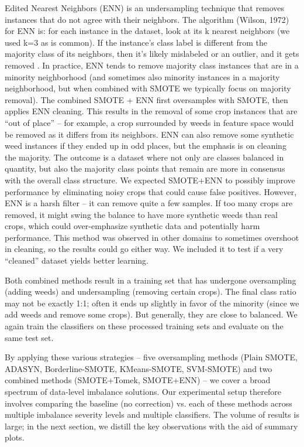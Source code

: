 \documentclass[agriengineering,article,submit,pdftex,moreauthors]{Definitions/mdpi}
\begin{document}
Edited Nearest Neighbors (ENN) is an undersampling technique that removes instances that do not agree with their neighbors. The algorithm (Wilson, 1972) for ENN is: for each instance in the dataset, look at its k nearest neighbors (we used k=3 as is common). If the instance’s class label is different from the majority class of its neighbors, then it’s likely mislabeled or an outlier, and it gets removed \cite{Wilson1972-dg}. In practice, ENN tends to remove majority class instances that are in a minority neighborhood (and sometimes also minority instances in a majority neighborhood, but when combined with SMOTE we typically focus on majority removal). The combined SMOTE + ENN first oversamples with SMOTE, then applies ENN cleaning. This results in the removal of some crop instances that are “out of place” – for example, a crop surrounded by weeds in feature space would be removed as it differs from its neighbors. ENN can also remove some synthetic weed instances if they ended up in odd places, but the emphasis is on cleaning the majority. The outcome is a dataset where not only are classes balanced in quantity, but also the majority class points that remain are more in consensus with the overall class structure. We expected SMOTE+ENN to possibly improve performance by eliminating noisy crops that could cause false positives. However, ENN is a harsh filter – it can remove quite a few samples. If too many crops are removed, it might swing the balance to have more synthetic weeds than real crops, which could over-emphasize synthetic data and potentially harm performance. This method was observed in other domains to sometimes overshoot in cleaning, so the results could go either way. We included it to test if a very “cleaned” dataset yields better learning.

Both combined methods result in a training set that has undergone oversampling (adding weeds) and undersampling (removing certain crops). The final class ratio may not be exactly 1:1; often it ends up slightly in favor of the minority (since we add weeds and remove some crops). But generally, they are close to balanced. We again train the classifiers on these processed training sets and evaluate on the same test set.

By applying these various strategies – five oversampling methods (Plain SMOTE, ADASYN, Borderline-SMOTE, KMeans-SMOTE, SVM-SMOTE) and two combined methods (SMOTE+Tomek, SMOTE+ENN) – we cover a broad spectrum of data-level imbalance solutions. Our experimental setup therefore involves comparing the baseline (no correction) vs. each of these methods across multiple imbalance severity levels and multiple classifiers. The volume of results is large; in the next section, we distill the key observations with the aid of summary plots.
\end{document}
